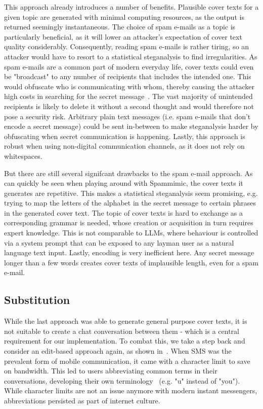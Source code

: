 This approach already introduces a number of benefits. Plausible cover texts for a given topic are generated with minimal computing resources, as the output is returned seemingly instantaneous. The choice of spam e-mails as a topic is particularly beneficial, as it will lower an attacker's expectation of cover text quality considerably. Consequently, reading spam e-mails is rather tiring, so an attacker would have to resort to a statistical steganalysis to find irregularities. As spam e-mails are a common part of modern everyday life, cover texts could even be "broadcast" to any number of recipients that includes the intended one. This would obfuscate who is communicating with whom, thereby causing the attacker high costs in searching for the secret message~\cite{bennettLinguisticSteganographySurvey2004,petitcolasInformationHidingSurvey1999}. The vast majority of unintended recipients is likely to delete it without a second thought and would therefore not pose a security risk. Arbitrary plain text messages (i.e. spam e-mails that don't encode a secret message) could be sent in-between to make steganalysis harder by obfuscating when secret communication is happening. Lastly, this approach is robust when using non-digital communication channels, as it does not rely on whitespaces.

But there are still several signifcant drawbacks to the spam e-mail approach. As can quickly be seen when playing around with Spammimic, the cover texts it generates are repetitive. This makes a statistical steganalysis seem promising, e.g. trying to map the letters of the alphabet in the secret message to certain phrases in the generated cover text. The topic of cover texts is hard to exchange as a corresponding grammar is needed, whose creation or acquisition in turn requires expert knowledge. This is not comparable to \glspl{LLM}, where behaviour is controlled via a system prompt that can be exposed to any layman user as a natural language text input. Lastly, encoding is very inefficient here. Any secret message longer than a few words creates cover texts of implausible length, even for a spam e-mail.

\subsection{Substitution}
\label{sec:substitution}
While the last approach was able to generate general purpose cover texts, it is not suitable to create a chat conversation between them - which is a central requirement for our implementation. To combat this, we take a step back and consider an edit-based approach again, as shown in~\cite{shirali-shahrezaTextSteganographySMS2007}. When \gls{SMS} was the prevalent form of mobile communication, it came with a character limit to save on bandwidth. This led to users abbreviating common terms in their conversations, developing their own terminology~\cite{shirali-shahrezaTextSteganographySMS2007} (e.g. "u" instead of "you"). While character limits are not an issue anymore with modern instant messengers, abbreviations persisted as part of internet culture.

